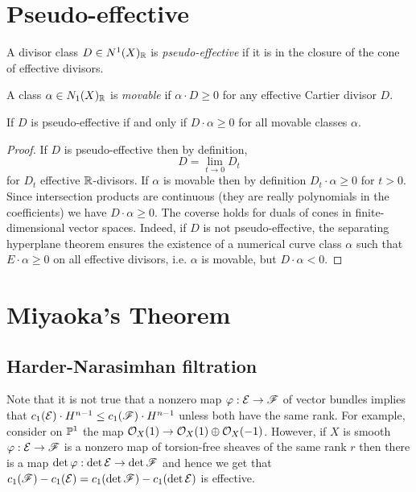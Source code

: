 \documentclass[12pt]{article}
\begin{document}
\section{Pseudo-effective}

\begin{defn}
A divisor class $D \in N^1(X)_{\RR}$ is \textit{pseudo-effective} if it is in the closure of the cone of effective divisors. 
\end{defn}

\begin{defn}
A class $\alpha \in N_1(X)_{\RR}$ is \textit{movable} if $\alpha \cdot D \ge 0$ for any effective Cartier divisor $D$.
\end{defn}

\begin{prop}
If $D$ is pseudo-effective if and only if $D \cdot \alpha \ge 0$ for all movable classes $\alpha$. 
\end{prop}

\begin{proof}
If $D$ is pseudo-effective then by definition,
\[ D = \lim_{t \to 0} D_t \]
for $D_t$ effective $\RR$-divisors. If $\alpha$ is movable then by definition $D_t \cdot \alpha \ge 0$ for $t > 0$. Since intersection products are continuous (they are really polynomials in the coefficients) we have $D \cdot \alpha \ge 0$. The coverse holds for duals of cones in finite-dimensional vector spaces. Indeed, if $D$ is not pseudo-effective, the separating hyperplane theorem ensures the existence of a numerical curve class $\alpha$ such that $E \cdot \alpha \ge 0$ on all effective divisors, i.e. $\alpha$ is movable, but $D \cdot \alpha < 0$.
\end{proof}



\section{Miyaoka's Theorem}


\subsection{Harder-Narasimhan filtration}

\begin{rmk}
Note that it is not true that a nonzero map $\varphi : \E \to \F$ of vector bundles implies that $c_1(\E) \cdot H^{n-1} \le c_1(\F) \cdot H^{n-1}$ unless both have the same rank. For example, consider on $\P^1$ the map $\struct{X}(1) \to \struct{X}(1) \oplus \struct{X}(-1)$. However, if $X$ is smooth $\varphi : \E \to \F$ is a nonzero map of torsion-free sheaves of the same rank $r$ then there is a map $\det{\varphi} : \det{\E} \to \det{\F}$ and hence we get that $c_1(\F) - c_1(\E) = c_1(\det{\F}) - c_1(\det{\E})$ is effective. 
\end{rmk}
\end{document}
